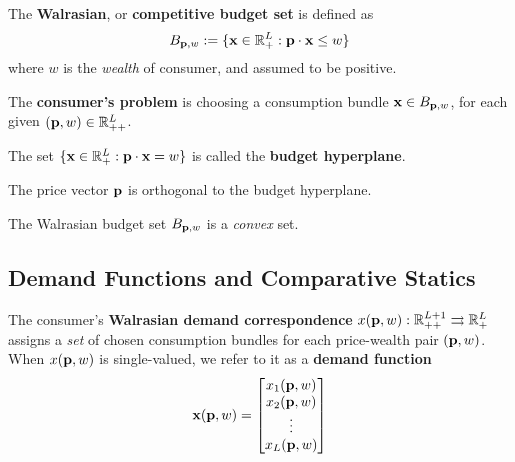 \documentclass{article}
\begin{document}
 			\begin{definition}[2.D.1]
 				The \textbf{Walrasian}, or \textbf{competitive budget set} is defined as
 				\begin{equation}
 					B_{\textbf{p}, w} := \{
 						\textbf{x} \in \mathbb{R}^L_+: \textbf{p} \cdot \textbf{x} \leq w
 					\}
 				\end{equation}
 				where $w$ is the \emph{wealth} of consumer, and assumed to be positive.
 			\end{definition}
 			
 			\begin{definition}
 				The \textbf{consumer's problem} is choosing a consumption bundle $\textbf{x} \in B_{\textbf{p}, w}$, for each given $(\textbf{p}, w) \in \mathbb{R}^L_{++}$.
 			\end{definition}
 			
 			\begin{definition}
 				The set $\{\textbf{x} \in \mathbb{R}^L_+: \textbf{p} \cdot \textbf{x} = w\}$ is called the \textbf{budget hyperplane}.
 			\end{definition}
 			
 			\begin{proposition}
 				The price vector $\textbf{p}$ is orthogonal to the budget hyperplane.
 			\end{proposition}
 			
 			\begin{proposition}
 				The Walrasian budget set $B_{\textbf{p}, w}$ is a \emph{convex} set.
 			\end{proposition}
 		
 		\subsection{Demand Functions and Comparative Statics}
 			\begin{definition}
 				The consumer's \textbf{Walrasian demand correspondence} $x(\textbf{p}, w): \mathbb{R}_{++}^{L+1} \rightrightarrows \mathbb{R}_+^L$ assigns a \emph{set} of chosen consumption bundles for each price-wealth pair $(\textbf{p}, w)$. When $x(\textbf{p}, w)$ is single-valued, we refer to it as a \textbf{demand function}
 				\begin{equation}
 					\textbf{x}(\textbf{p}, w) = 
 					\begin{bmatrix}
 						x_1(\textbf{p}, w) \\
 						x_2(\textbf{p}, w) \\
 						\vdots \\
 						x_L(\textbf{p}, w)
 					\end{bmatrix}
 				\end{equation}
 			\end{definition}
 			
\end{document}
